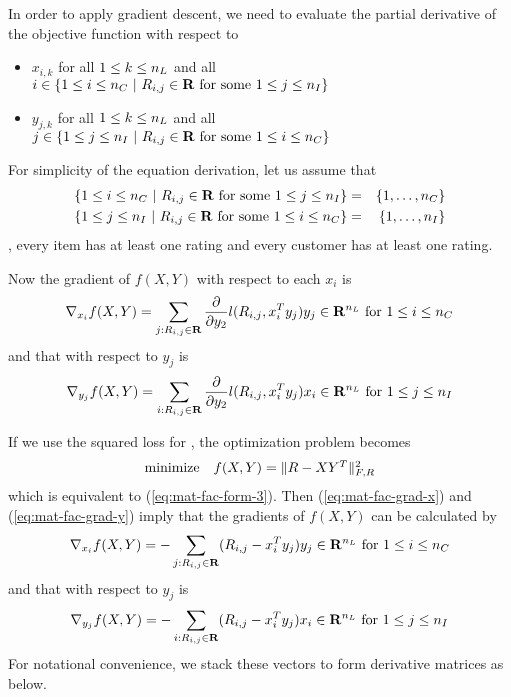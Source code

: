 In order to apply gradient descent, we need to evaluate the partial derivative of the objective function
with respect to
\begin{itemize}
\item $x_{i,k}$ for all $1\leq k\leq {n_L}$ and all $i \in \{1\leq i\leq {n_C}~|~R_{i,j} \in\mathbf{R} \mbox{ for some } 1\leq j\leq {n_I}\}$
\item $y_{j,k}$ for all $1\leq k\leq {n_L}$ and all $j \in \{1\leq j\leq {n_I}~|~R_{i,j} \in\mathbf{R} \mbox{ for some } 1\leq i\leq {n_C}\}$
\end{itemize}
For simplicity of the equation derivation,
let us assume that
\begin{eqnarray}
\{1\leq i\leq {n_C}~|~R_{i,j} \in\mathbf{R} \mbox{ for some } 1\leq j\leq {n_I}\}
&=&
\{1,\ldots, {n_C}\}
\\
\{1\leq j\leq {n_I}~|~R_{i,j} \in\mathbf{R} \mbox{ for some } 1\leq i\leq {n_C}\}
&=&
\{1,\ldots, {n_I}\}
\end{eqnarray}
\ie,
every item has at least one rating and every customer has at least one rating.


Now the gradient of $f(X,Y)$ with respect to each $x_i$ is
\begin{equation}
\label{eq:mat-fac-grad-x}
\nabla_{x_i}  f(X,Y)
= \sum_{j:R_{i,j}\in\mathbf{R}} \frac{\partial}{\partial y_2} l(R_{i,j}, x_i^T y_j) y_j \in\mathbf{R}^{{n_L}}
\mbox{ for } 1\leq i\leq {n_C}
\end{equation}
and that with respect to $y_j$ is
\begin{equation}
\label{eq:mat-fac-grad-y}
\nabla_{y_j}  f(X,Y)
= \sum_{i:R_{i,j}\in\mathbf{R}} \frac{\partial}{\partial y_2} l(R_{i,j}, x_i^T y_j) x_i \in\mathbf{R}^{{n_L}}
\mbox{ for } 1\leq j\leq {n_I}
\end{equation}

If we use the squared loss for \lfcn,
the optimization problem becomes
\begin{equation}
\label{eq:mat-fac-form-5}
\begin{array}{ll}
\mbox{minimize} & f(X,Y) = \|R - XY^T\|_{F,R}^2
\end{array}
\end{equation}
which is equivalent to (\ref{eq:mat-fac-form-3}).
Then (\ref{eq:mat-fac-grad-x}) and (\ref{eq:mat-fac-grad-y})
imply that the gradients of $f(X,Y)$ can be calculated by
\begin{equation}
\label{eq:mat-fac-sq-grad-x}
\nabla_{x_i}  f(X,Y)
= - \sum_{j:R_{i,j}\in\mathbf{R}} (R_{i,j} -x_i^T y_j) y_j \in\mathbf{R}^{{n_L}}
\mbox{ for } 1\leq i\leq {n_C}
\end{equation}
and that with respect to $y_j$ is
\begin{equation}
\label{eq:mat-fac-sq-grad-y}
\nabla_{y_j}  f(X,Y)
= - \sum_{i:R_{i,j}\in\mathbf{R}} (R_{i,j}- x_i^T y_j) x_i \in\mathbf{R}^{{n_L}}
\mbox{ for } 1\leq j\leq {n_I}
\end{equation}
For notational convenience, we stack these vectors to form derivative matrices as below.

